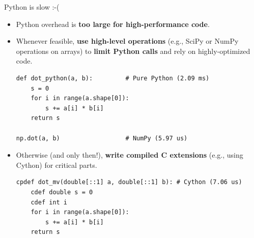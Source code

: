 \documentclass{beamer}
\begin{document}
\begin{frame}[fragile]{Python is slow :-(}

\begin{itemize}
\item Python overhead is {\bf too large for high-performance code}.
\item Whenever feasible, {\bf use high-level operations} (e.g., SciPy or NumPy operations on arrays)
  to {\bf limit Python calls} and rely on highly-optimized code.
\begin{verbatim}
def dot_python(a, b):         # Pure Python (2.09 ms)
    s = 0
    for i in range(a.shape[0]):
        s += a[i] * b[i]
    return s

np.dot(a, b)                  # NumPy (5.97 us)
\end{verbatim}
\item Otherwise (and only then!), {\bf write compiled C extensions} (e.g., using Cython) for critical parts.
\begin{verbatim}
cpdef dot_mv(double[::1] a, double[::1] b): # Cython (7.06 us)
    cdef double s = 0
    cdef int i
    for i in range(a.shape[0]):
        s += a[i] * b[i]
    return s
\end{verbatim}
\end{itemize}

\end{frame}
\end{document}
